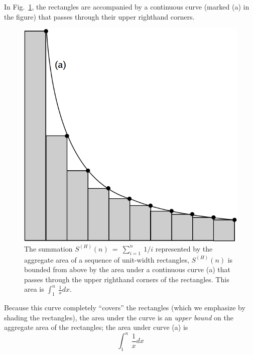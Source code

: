 \begin{enumerate}
In Fig.~\ref{fig:riemann-harmonic1}, the rectangles are accompanied by
a continuous curve (marked (a) in the figure) that passes through
their upper righthand corners.
\begin{figure}[htb]
\centerline{
\includegraphics[scale=0.3]{FiguresMaths/RiemannSum1}
}
\caption{The summation $S^{(H)}(n) \ = \ \sum_{i=1}^n \ 1/i$
  represented by the aggregate area of a sequence of unit-width
  rectangles, $S^{(H)}(n)$ is bounded from above by the area under a
  continuous curve (a) that passes through the upper righthand corners
  of the rectangles.  This area is $ \int_1^n \ \frac{1}{x} dx$. }
\label{fig:riemann-harmonic1}
\end{figure}
Because this curve completely ``covers'' the rectangles (which we
emphasize by shading the rectangles), the area under the curve is an
{\em upper bound} on the aggregate area of the rectangles; the area
under curve (a) is
\[ \int_1^n \ \frac{1}{x} dx \]


\end{enumerate}
